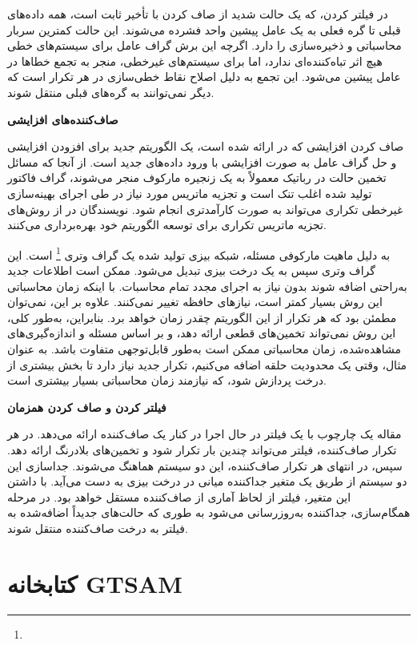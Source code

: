 در فیلتر کردن، که یک حالت شدید از صاف کردن با تأخیر ثابت است، همه داده‌های قبلی تا گره فعلی به یک عامل پیشین واحد فشرده می‌شوند. این حالت کمترین سربار محاسباتی و ذخیره‌سازی را دارد. اگرچه این برش گراف عامل برای سیستم‌های خطی هیچ اثر تباه‌کننده‌ای ندارد، اما برای سیستم‌های غیرخطی، منجر به تجمع خطاها در عامل پیشین می‌شود. این تجمع به دلیل اصلاح نقاط خطی‌سازی در هر تکرار است که دیگر نمی‌توانند به گره‌های قبلی منتقل شوند.

\textbf{صاف‌کننده‌های افزایشی}

صاف کردن افزایشی که در
\cite{kaess2012concurrent}
ارائه شده است، یک الگوریتم جدید برای افزودن افزایشی و حل گراف عامل به صورت افزایشی با ورود داده‌های جدید است. از آنجا که مسائل تخمین حالت در رباتیک معمولاً به یک زنجیره مارکوف منجر می‌شوند، گراف فاکتور تولید شده اغلب تنک است و تجزیه ماتریس مورد نیاز در طی اجرای بهینه‌سازی غیرخطی تکراری می‌تواند به صورت کارآمدتری انجام شود. نویسندگان در
\cite{kaess2012concurrent}
از روش‌های تجزیه ماتریس تکراری برای توسعه الگوریتم خود بهره‌برداری می‌کنند.

به دلیل ماهیت مارکوفی مسئله، شبکه بیزی تولید شده یک گراف وتری
\footnote{}
 است. این گراف وتری سپس به یک درخت بیزی تبدیل می‌شود. ممکن است اطلاعات جدید به‌راحتی اضافه شوند بدون نیاز به اجرای مجدد تمام محاسبات. با اینکه زمان محاسباتی این روش بسیار کمتر است، نیازهای حافظه تغییر نمی‌کنند. علاوه بر این، نمی‌توان مطمئن بود که هر تکرار از این الگوریتم چقدر زمان خواهد برد. بنابراین، به‌طور کلی، این روش نمی‌تواند تخمین‌های قطعی ارائه دهد، و بر اساس مسئله و اندازه‌گیری‌های مشاهده‌شده، زمان محاسباتی ممکن است به‌طور قابل‌توجهی متفاوت باشد. به عنوان مثال، وقتی یک محدودیت حلقه اضافه می‌کنیم، تکرار جدید نیاز دارد تا بخش بیشتری از درخت پردازش شود، که نیازمند زمان محاسباتی بسیار بیشتری است.

\textbf{فیلتر کردن و صاف کردن همزمان}

مقاله
\cite{kaess2012concurrent}
یک چارچوب با یک فیلتر در حال اجرا در کنار یک صاف‌کننده ارائه می‌دهد. در هر تکرار صاف‌کننده، فیلتر می‌تواند چندین بار تکرار شود و تخمین‌های بلادرنگ ارائه دهد. سپس، در انتهای هر تکرار صاف‌کننده، این دو سیستم هماهنگ می‌شوند. جداسازی این دو سیستم از طریق یک متغیر جداکننده میانی در درخت بیزی به دست می‌آید. با داشتن این متغیر، فیلتر از لحاظ آماری از صاف‌کننده مستقل خواهد بود. در مرحله همگام‌سازی، جداکننده به‌روزرسانی می‌شود به طوری که حالت‌های جدیداً اضافه‌شده به فیلتر به درخت صاف‌کننده منتقل شوند.

\section{کتابخانه GTSAM}


